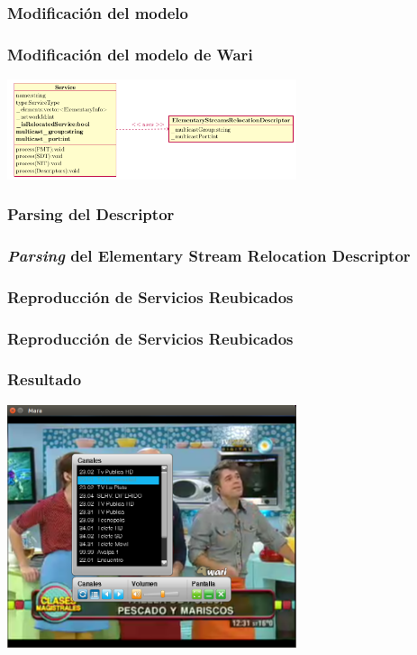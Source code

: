 \documentclass[a4paper,11pt]{beamer}
\begin{document}
		\subsubsection{Modificación del modelo}
		\begin{frame}
			\frametitle{Modificación del modelo de Wari}
			\begin{center}
				\includegraphics[width=8.5cm]{service_new_model.png}
			\end{center}
		\end{frame}

		\subsubsection{Parsing del Descriptor}
		\begin{frame}
			\frametitle{\emph{Parsing} del Elementary Stream Relocation Descriptor}
			\resizebox{\textwidth}{!}{
				
			}
		\end{frame}

		\subsubsection{Reproducción de Servicios Reubicados}
		\begin{frame}
			\frametitle{Reproducción de Servicios Reubicados}
			\resizebox{\textwidth}{!}{
				
			}
		\end{frame}
		\begin{frame}
			\frametitle{Resultado}
			\begin{center}
				\includegraphics[width=8.5cm]{screenshot_mara.png}
			\end{center}
		\end{frame}
\end{document}
